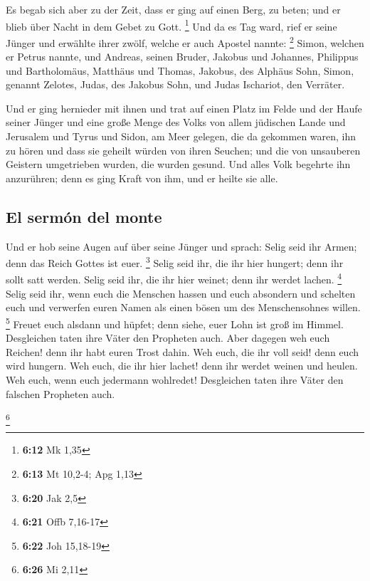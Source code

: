  Es begab sich aber zu der Zeit, dass er ging auf einen
Berg, zu beten; und er blieb über Nacht in dem Gebet zu Gott.
\footnote{\textbf{6:12} Mk 1,35}  Und da es Tag ward,
rief er seine Jünger und erwählte ihrer zwölf, welche er auch Apostel
nannte: \footnote{\textbf{6:13} Mt 10,2-4; Apg 1,13} 
Simon, welchen er Petrus nannte, und Andreas, seinen Bruder, Jakobus und
Johannes, Philippus und Bartholomäus,  Matthäus und
Thomas, Jakobus, des Alphäus Sohn, Simon, genannt Zelotes,
 Judas, des Jakobus Sohn, und Judas Ischariot, den
Verräter.

 Und er ging hernieder mit ihnen und trat auf einen Platz
im Felde und der Haufe seiner Jünger und eine große Menge des Volks von
allem jüdischen Lande und Jerusalem und Tyrus und Sidon, am Meer
gelegen,  die da gekommen waren, ihn zu hören und dass
sie geheilt würden von ihren Seuchen; und die von unsauberen Geistern
umgetrieben wurden, die wurden gesund.  Und alles Volk
begehrte ihn anzurühren; denn es ging Kraft von ihm, und er heilte sie
alle.

\hypertarget{el-sermuxf3n-del-monte}{%
\subsection{El sermón del monte}\label{el-sermuxf3n-del-monte}}

 Und er hob seine Augen auf über seine Jünger und sprach:
Selig seid ihr Armen; denn das Reich Gottes ist euer. \footnote{\textbf{6:20}
  Jak 2,5}  Selig seid ihr, die ihr hier hungert; denn
ihr sollt satt werden. Selig seid ihr, die ihr hier weinet; denn ihr
werdet lachen. \footnote{\textbf{6:21} Offb 7,16-17} 
Selig seid ihr, wenn euch die Menschen hassen und euch absondern und
schelten euch und verwerfen euren Namen als einen bösen um des
Menschensohnes willen. \footnote{\textbf{6:22} Joh 15,18-19}
 Freuet euch alsdann und hüpfet; denn siehe, euer Lohn
ist groß im Himmel. Desgleichen taten ihre Väter den Propheten auch.
 Aber dagegen weh euch Reichen! denn ihr habt euren Trost
dahin.  Weh euch, die ihr voll seid! denn euch wird
hungern. Weh euch, die ihr hier lachet! denn ihr werdet weinen und
heulen.  Weh euch, wenn euch jedermann wohlredet!
Desgleichen taten ihre Väter den falschen Propheten auch.

\footnote{\textbf{6:26} Mi 2,11}

